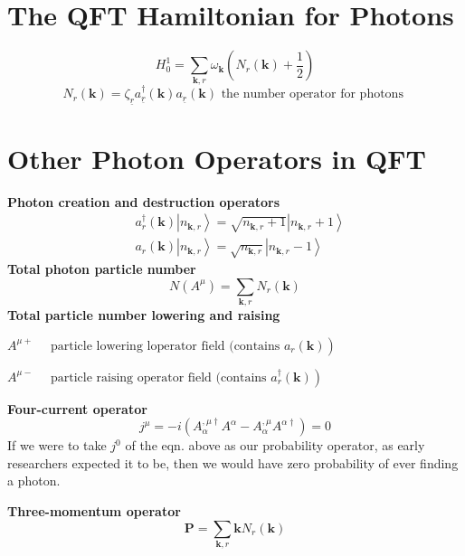 \section{The QFT Hamiltonian for Photons}
\begin{equation}
H_{0}^{1}=\sum_{\mathbf{k}, r} \omega_{\mathbf{k}}\left(N_{r}(\mathbf{k})+\frac{1}{2}\right)
\end{equation}
\begin{equation}
N_{r}(\mathbf{k})=\zeta_{\underline{r}} a_{\underline{r}}^{\dagger}(\mathbf{k}) a_{\underline{r}}(\mathbf{k}) \text { the number operator for photons }
\end{equation}
\section{Other Photon Operators in QFT}
\textbf{Photon creation and destruction operators}
\begin{equation}
\begin{aligned}
&a_{r}^{\dagger}(\mathbf{k})\left|n_{\mathbf{k}, r}\right\rangle=\sqrt{n_{\mathbf{k}, r}+1}\left|n_{\mathbf{k}, r}+1\right\rangle\\
&a_{r}(\mathbf{k})\left|n_{\mathbf{k}, r}\right\rangle=\sqrt{n_{\mathbf{k}, r}}\left|n_{\mathbf{k}, r}-1\right\rangle
\end{aligned}
\end{equation}
\textbf{Total photon particle number}
\begin{equation}
N\left(A^{\mu}\right)=\sum_{\mathbf{k}, r} N_{r}(\mathbf{k})
\end{equation}
\textbf{Total particle number lowering and raising}

$\left.A^{\mu+} \quad \text { particle lowering loperator field (contains } a_{r}(\mathbf{k})\right)$

$\left.A^{\mu-} \quad \text { particle raising operator field (contains } a_{r}^{\dagger}(\mathbf{k})\right)$

\textbf{Four-current operator}
\begin{equation}
j^{\mu}=-i\left(A_{\alpha}^{, \mu \dagger} A^{\alpha}-A_{\alpha}^{, \mu} A^{\alpha \dagger}\right)=0
\end{equation}
If we were to take $j^{0}$ of the eqn. above as our probability operator, as early researchers expected it to be, then we would have zero probability of ever finding a photon. 

\textbf{Three-momentum operator}
\begin{equation}
\mathbf{P}=\sum_{\mathbf{k}, r} \mathbf{k} N_{r}(\mathbf{k})
\end{equation}
